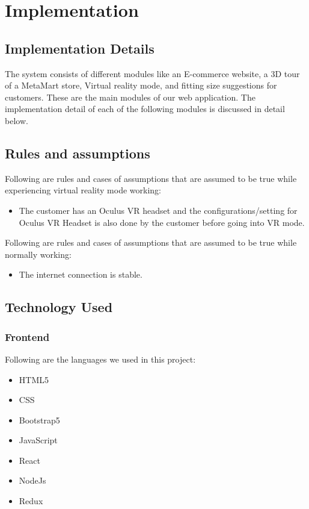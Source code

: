 \newpage
\begingroup%
\makeatletter%
\let\clearpage\relax%
\vspace*{\fill}%
\vspace*{\dimexpr-50\p@-\baselineskip}%
\chapterfont{\centering}
\chapter{Implementation} %

\vspace*{\fill}%
\endgroup

\newpage
\label{Chapter4}


\section{Implementation Details}
The system consists of different modules like an E-commerce website, a 3D tour of a MetaMart store, Virtual reality mode, and fitting size suggestions for customers. These are the main modules of our web application.
The implementation detail of each of the following modules is discussed in detail below.
\section{Rules and assumptions}
Following are rules and cases of assumptions that are assumed to be true while experiencing virtual reality mode working:
\begin{itemize}
    \item The customer has an Oculus VR headset and the configurations/setting for Oculus VR Headset is also done by the customer before going into VR mode.
\end{itemize}
Following are rules and cases of assumptions that are assumed to be true while normally working:
\begin{itemize}
    \item The internet connection is stable.
\end{itemize}
\section{Technology Used}
\subsection{Frontend}
Following are the languages we used in this project:
\begin{itemize}
  \item HTML5
  \item CSS
  \item Bootstrap5
  \item JavaScript
  \item React
  \item NodeJs
  \item Redux
\end{itemize}  
